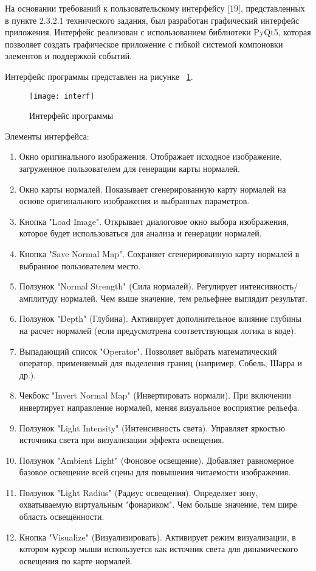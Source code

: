 На основании требований к пользовательскому интерфейсу [19], представленных в пункте 2.3.2.1 технического задания, был разработан графический интерфейс приложения. Интерфейс реализован с использованием библиотеки PyQt5, которая позволяет создать графическое приложение с гибкой системой компоновки элементов и поддержкой событий.

Интерфейс программы представлен на рисунке ~\ref{interf:image}.

\begin{figure}[ht]
	\texttt{[image: interf]}
	\caption{Интерфейс программы}
	\label{interf:image}
\end{figure}

Элементы интерфейса:
\begin{enumerate}
	\item Окно оригинального изображения. Отображает исходное изображение, загруженное пользователем для генерации карты нормалей.
	\item Окно карты нормалей. Показывает сгенерированную карту нормалей на основе оригинального изображения и выбранных параметров.
	\item Кнопка "Load Image". Открывает диалоговое окно выбора изображения, которое будет использоваться для анализа и генерации нормалей.
	\item  Кнопка "Save Normal Map". Сохраняет сгенерированную карту нормалей в выбранное пользователем место.
	\item Ползунок "Normal Strength" (Сила нормалей). Регулирует интенсивность/амплитуду нормалей. Чем выше значение, тем рельефнее выглядит результат.
	\item Ползунок "Depth" (Глубина). Активирует дополнительное влияние глубины на расчет нормалей (если предусмотрена соответствующая логика в коде).
	\item Выпадающий список "Operator". Позволяет выбрать математический оператор, применяемый для выделения границ (например, Собель, Шарра и др.).
	\item Чекбокс "Invert Normal Map" (Инвертировать нормали). При включении инвертирует направление нормалей, меняя визуальное восприятие рельефа.
	\item Ползунок "Light Intensity" (Интенсивность света). Управляет яркостью источника света при визуализации эффекта освещения.
	\item Ползунок "Ambient Light" (Фоновое освещение). Добавляет равномерное базовое освещение всей сцены для повышения читаемости изображения.
	\item  Ползунок "Light Radius" (Радиус освещения). Определяет зону, охватываемую виртуальным "фонариком". Чем больше значение, тем шире область освещённости.
	\item Кнопка "Visualize" (Визуализировать). Активирует режим визуализации, в котором курсор мыши используется как источник света для динамического освещения по карте нормалей.
\end{enumerate}
